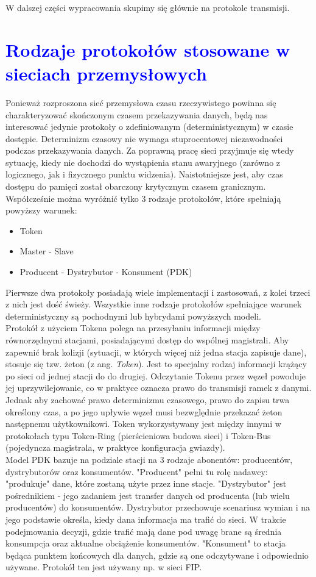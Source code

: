 \documentclass[a4paper,twoside]{article}
\begin{document}
W dalszej części wypracowania skupimy się głównie na protokole transmisji.


\section{\textcolor{blue}{Rodzaje protokołów stosowane w sieciach przemysłowych}}

Ponieważ rozproszona sieć przemysłowa czasu rzeczywistego powinna się charakteryzować skończonym czasem przekazywania danych, będą nas interesować jedynie protokoły o zdefiniowanym (deterministycznym) w czasie dostępie. Determinizm czasowy nie wymaga stuprocentowej niezawodności podczas przekazywania danych. Za poprawną pracę sieci przyjmuje się wtedy sytuację, kiedy nie dochodzi do wystąpienia stanu awaryjnego (zarówno z logicznego, jak i fizycznego punktu widzenia). Naistotniejsze jest, aby czas dostępu do pamięci został obarczony krytycznym czasem granicznym.\\
Współcześnie można wyróżnić tylko 3 rodzaje protokołów, które spełniają powyższy warunek:
\begin{itemize}
	\item Token
	\item Master - Slave
	\item Producent - Dystrybutor - Konsument (PDK)
\end{itemize}
Pierwsze dwa protokoły posiadają wiele implementacji i zastosowań, z kolei trzeci z nich jest dość świeży. Wszystkie inne rodzaje protokołów spełniające warunek deterministyczny są pochodnymi lub hybrydami powyższych modeli. \\
Protokół z użyciem Tokena polega na przesyłaniu informacji między równorzędnymi stacjami, posiadającymi dostęp do wspólnej magistrali. Aby zapewnić brak kolizji (sytuacji, w których więcej niż jedna stacja zapisuje dane), stosuje się tzw. żeton (z ang. \textit{Token}). Jest to specjalny rodzaj informacji krążący po sieci od jednej stacji do do drugiej. Odczytanie Tokenu przez węzeł powoduje jej uprzywilejowanie, co w praktyce oznacza prawo do transmisji ramek z danymi. Jednak aby zachować prawo determinizmu czasowego, prawo do zapisu trwa określony czas, a po jego upływie węzeł musi bezwględnie przekazać żeton następnemu użytkownikowi. Token wykorzystywany jest między innymi w protokołach typu Token-Ring (pierścieniowa budowa sieci) i Token-Bus (pojedyncza magistrala, w praktyce konfiguracja gwiazdy). \\
Model PDK bazuje na podziale stacji na 3 rodzaje abonentów: producentów, dystrybutorów oraz konsumentów. "Producent" pełni tu rolę nadawcy: "produkuje" dane, które zostaną użyte przez inne stacje. "Dystrybutor" jest pośrednikiem - jego zadaniem jest transfer danych od producenta (lub wielu producentów) do konsumentów. Dystrybutor przechowuje scenariusz wymian i na jego podstawie określa, kiedy dana informacja ma trafić do sieci. W trakcie podejmowania decyzji, gdzie trafić mają dane pod uwagę brane są średnia konsumpcja oraz aktualne obciążenie konsumentów. "Konsument" to stacja będąca punktem końcowych dla danych, gdzie są one odczytywane i odpowiednio używane. Protokół ten jest używany np. w sieci FIP.
\end{document}

